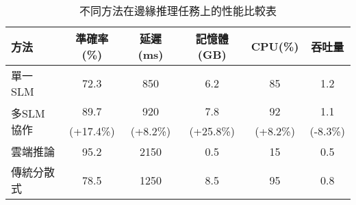 \begin{table}[h]
\centering
\small
\caption[性能比較結果]{不同方法在邊緣推理任務上的性能比較表}
\label{table:performance_comparison}
\begin{tabular}{lccccc}
\toprule[1.1pt]
方法 & 準確率(\%) & 延遲(ms) & 記憶體(GB) & CPU(\%) & 吞吐量\\
\midrule[1.1pt]
單一SLM & 72.3 & 850 & 6.2 & 85 & 1.2\\
\multirow{2}{*}{多SLM協作} & 89.7 & 920 & 7.8 & 92 & 1.1\\
& (+17.4\%) & (+8.2\%) & (+25.8\%) & (+8.2\%) & (-8.3\%)\\
\midrule[1.1pt]
雲端推論 & 95.2 & 2150 & 0.5 & 15 & 0.5\\
\midrule[1.1pt]
傳統分散式 & 78.5 & 1250 & 8.5 & 95 & 0.8\\
\bottomrule[1.1pt]
\end{tabular}
\end{table} 